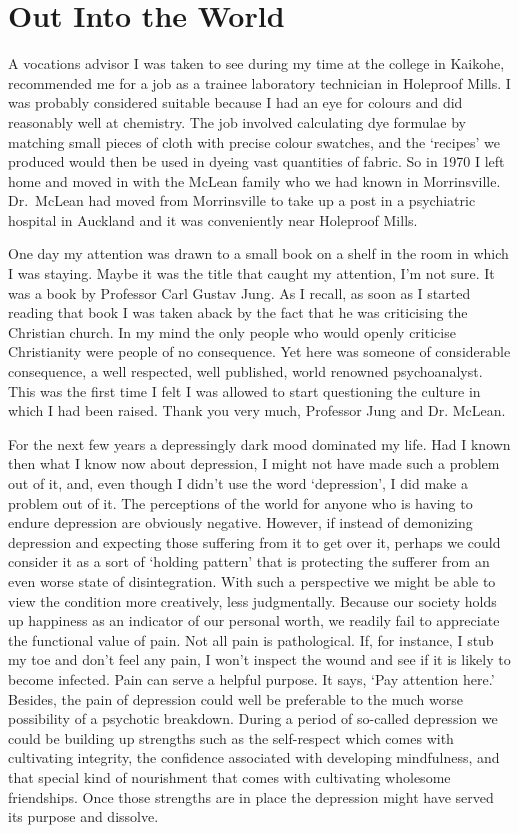 \chapter{Out Into the World}

A vocations advisor I was taken to see during my time at the college in
Kaikohe, recommended me for a job as a trainee laboratory technician in
Holeproof Mills. I was probably considered suitable because I had
an eye for colours and did reasonably well at chemistry. The job
involved calculating dye formulae by matching small pieces of cloth with
precise colour swatches, and the `recipes' we produced would then be
used in dyeing vast quantities of fabric. So in 1970 I left home and
moved in with the McLean family who we had known in Morrinsville.
Dr.~McLean had moved from Morrinsville to take up a post in a psychiatric
hospital in Auckland and it was conveniently near Holeproof Mills.

One day my attention was drawn to a small book on a shelf in the room in
which I was staying. Maybe it was the title that caught my attention,
I'm not sure. It was a book by Professor Carl Gustav Jung. As I recall,
as soon as I started reading that book I was taken aback by the fact
that he was criticising the Christian church. In my mind the only people
who would openly criticise Christianity were people of no consequence.
Yet here was someone of considerable consequence, a well respected, well
published, world renowned psychoanalyst. This was the first time I felt
I was allowed to start questioning the culture in
which I had been raised. Thank you very much, Professor Jung and Dr. McLean.

For the next few years a depressingly dark mood dominated my life. Had I
known then what I know now about depression, I might not have made such
a problem out of it, and, even though I didn't use the word
`depression', I did make a problem out of it. The perceptions of the
world for anyone who is having to endure depression are obviously
negative. However, if instead of demonizing depression and expecting
those suffering from it to get over it, perhaps we could consider it as
a sort of `holding pattern' that is protecting the sufferer from an even
worse state of disintegration. With such a perspective we might be able
to view the condition more creatively, less judgmentally. Because our
society holds up happiness as an indicator of our personal worth, we
readily fail to appreciate the functional value of pain. Not all pain is
pathological. If, for instance, I stub my toe and don't feel any pain, I
won't inspect the wound and see if it is likely to become infected. Pain
can serve a helpful purpose. It says, `Pay attention here.' Besides, the
pain of depression could well be preferable to the much worse
possibility of a psychotic breakdown. During a period of so-called
depression we could be building up strengths such as the self-respect
which comes with cultivating integrity, the confidence associated with
developing mindfulness, and that special kind of nourishment that comes
with cultivating wholesome friendships. Once those strengths are in
place the depression might have served its purpose and dissolve.

